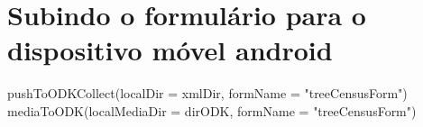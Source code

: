 \documentclass[
  letterpaper,
]{report}
\newenvironment{Shaded}{\begin{snugshade}}{\end{snugshade}}
\newcommand{\AttributeTok}[1]{\textcolor[rgb]{0.40,0.45,0.13}{#1}}
\newcommand{\FunctionTok}[1]{\textcolor[rgb]{0.28,0.35,0.67}{#1}}
\newcommand{\NormalTok}[1]{\textcolor[rgb]{0.00,0.23,0.31}{#1}}
\newcommand{\StringTok}[1]{\textcolor[rgb]{0.13,0.47,0.30}{#1}}
\begin{document}
\section{Subindo o formulário para o dispositivo móvel
android}\label{subindo-o-formuluxe1rio-para-o-dispositivo-muxf3vel-android}

\begin{Shaded}
\begin{Highlighting}[]
\FunctionTok{pushToODKCollect}\NormalTok{(}\AttributeTok{localDir =}\NormalTok{ xmlDir, }\AttributeTok{formName =} \StringTok{"treeCensusForm"}\NormalTok{)}
\FunctionTok{mediaToODK}\NormalTok{(}\AttributeTok{localMediaDir =}\NormalTok{ dirODK, }\AttributeTok{formName =} \StringTok{"treeCensusForm"}\NormalTok{)}
\end{Highlighting}
\end{Shaded}
\end{document}
